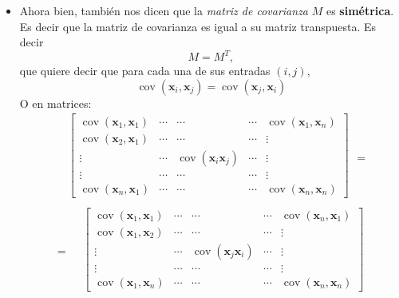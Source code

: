 \begin{problema}
\begin{enumerate}
\begin{sol}
\begin{enumerate}
\begin{itemize}
$$\begin{aligned}
\begin{array}{ccccc}
\vdots & \cdots & \cdots & \cdots & \vdots \\
\operatorname{cov}(\boldsymbol{x}_n,\boldsymbol{x}_1) & \cdots & \cdots & \cdots & \operatorname{cov}(\boldsymbol{x}_n,\boldsymbol{x}_n)
\end{array}\right] \\
&
\end{aligned}
$$
\item Ahora bien, también nos dicen que la \textit{matriz de covarianza} $M$ es \textbf{simétrica}. Es decir que la matriz de covarianza es igual a su matriz transpuesta. Es decir
$$M=M^T,$$
que quiere decir que para cada una de sus entradas $(i,j)$, 
$$\operatorname{cov}(\boldsymbol{x}_i,\boldsymbol{x}_j) = \operatorname{cov}(\boldsymbol{x}_j,\boldsymbol{x}_i)$$
O en matrices: 
$$
\begin{aligned}
& \left[\begin{array}{ccccc}
    \operatorname{cov}(\boldsymbol{x}_1,\boldsymbol{x}_1) & \cdots & \cdots & \cdots & \operatorname{cov}(\boldsymbol{x}_1 ,\boldsymbol{x}_n) \\
    \operatorname{cov}(\boldsymbol{x}_2,\boldsymbol{x}_1) & \cdots & \cdots & \cdots & \vdots \\
\vdots & \cdots & \operatorname{cov}(\boldsymbol{x}_i \boldsymbol{x}_j) & \cdots & \vdots \\
\vdots & \cdots & \cdots & \cdots & \vdots \\
\operatorname{cov}(\boldsymbol{x}_n,\boldsymbol{x}_1) & \cdots & \cdots & \cdots & \operatorname{cov}(\boldsymbol{x}_n,\boldsymbol{x}_n)
\end{array}\right] \\
&
\end{aligned} =
$$
$$=\begin{aligned}
    & \left[\begin{array}{ccccc}
        \operatorname{cov}(\boldsymbol{x}_1,\boldsymbol{x}_1) & \cdots & \cdots & \cdots & \operatorname{cov}(\boldsymbol{x}_n ,\boldsymbol{x}_1) \\
        \operatorname{cov}(\boldsymbol{x}_1,\boldsymbol{x}_2) & \cdots & \cdots & \cdots & \vdots \\
    \vdots & \cdots & \operatorname{cov}(\boldsymbol{x}_j \boldsymbol{x}_i) & \cdots & \vdots \\
    \vdots & \cdots & \cdots & \cdots & \vdots \\
    \operatorname{cov}(\boldsymbol{x}_1,\boldsymbol{x}_n) & \cdots & \cdots & \cdots & \operatorname{cov}(\boldsymbol{x}_n,\boldsymbol{x}_n)
    \end{array}\right] \\
    &
    \end{aligned}$$


\end{itemize}
\end{enumerate}
\end{sol}
\end{enumerate}
\end{problema}
